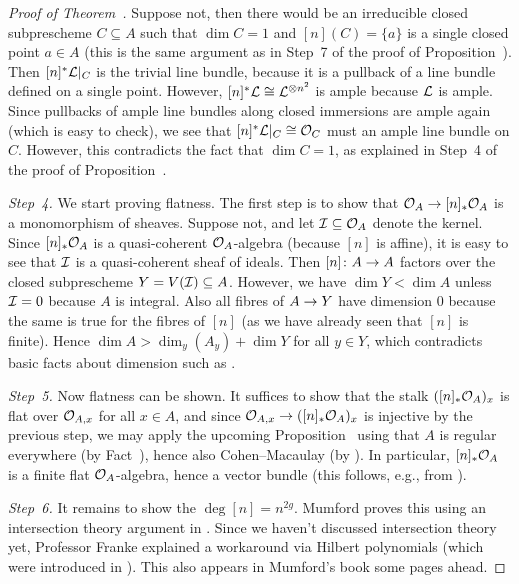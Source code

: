 \documentclass[a4paper,parskip=half,numbers=enddot, DIV=12]{scrreprt}
\begin{document}
\begin{proof}[Proof of Theorem~]
	Suppose not, then there would be an irreducible closed subprescheme $C\subseteq A$  such that $\dim C=1$ and $[n](C)=\{a\}$ is a single closed point $a\in A$ (this is the same argument as in Step~7 of the proof of Proposition~). Then $[n]^*\mathcal{L}|_C$ is the trivial line bundle, because it is a pullback of a line bundle defined on a single point. However, $[n]^*\mathcal{L}\cong \mathcal{L}^{\otimes n^2}$ is ample because $\mathcal{L}$ is ample. Since pullbacks of ample line bundles along closed immersions are ample again (which is easy to check), we see that $[n]^*\mathcal{L}|_C\cong \mathcal{O}_C$ must an ample line bundle on $C$. However, this contradicts the fact that $\dim C=1$, as explained in Step~4 of the proof of Proposition~.
	
	\emph{Step~4.} We start proving flatness. The first step is to show that $\Oo_A\morphism[] [n]_*\Oo_A$ is a monomorphism of sheaves. Suppose not, and let $\mathcal{I}\subseteq \mathcal{O}_A$ denote the kernel. Since $[n]_*\mathcal{O}_A$ is a quasi-coherent $\mathcal{O}_A$-algebra (because $[n]$ is affine), it is easy to see that $\mathcal{I}$ is a quasi-coherent sheaf of ideals. Then $[n]\colon A\morphism A$ factors over the closed subprescheme $Y=V(\mathcal{I})\subseteq A$. However, we have $\dim Y<\dim A$ unless $\mathcal{I}=0$ because $A$ is integral. Also all fibres of $A\morphism Y$ have dimension $0$ because the same is true for the fibres of $[n]$ (as we have already seen that $[n]$ is finite). Hence $\dim A>\dim_y(A_y)+\dim Y$ for all $y\in Y$, which contradicts basic facts about dimension such as \cite[]{stacks-project}.
	
	\emph{Step~5.} Now flatness can be shown. It suffices to show that the stalk $([n]_*\mathcal{O}_A)_x$ is flat over $\mathcal{O}_{A,x}$ for all $x\in A$, and since $\Oo_{A,x}\morphism ([n]_*\Oo_A)_x$ is injective by the previous step, we may apply the upcoming Proposition~ using that $A$ is regular everywhere (by Fact~), hence also Cohen--Macaulay (by \cite[Example~2.4.1]{homalg}). In particular, $[n]_*\mathcal{O}_A$ is a finite flat $\mathcal{O}_A$-algebra, hence a vector bundle (this follows, e.g., from \cite[Proposition~1.3.2]{homalg}).
	
	\emph{Step~6.} It remains to show the $\deg{[n]}=n^{2g}$. Mumford proves this using an intersection theory argument in \cite[63]{mumford1974abelian}. Since we haven't discussed intersection theory yet, Professor Franke explained a workaround via Hilbert polynomials (which were introduced in \cite[Section~3.1]{alg2}). This also appears in Mumford's book some pages ahead.
	

\end{proof}
\end{document}

